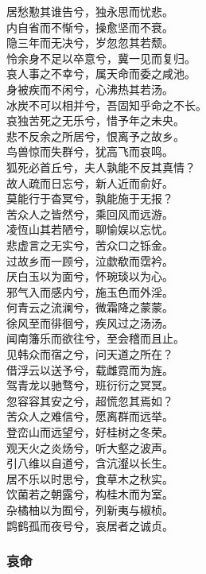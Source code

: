 \documentclass[]{article}
\begin{document}
居愁懃其谁告兮，独永思而忧悲。\\
内自省而不惭兮，操愈坚而不衰。\\
隐三年而无决兮，岁忽忽其若颓。\\
怜余身不足以卒意兮，冀一见而复归。\\
哀人事之不幸兮，属天命而委之咸池。\\
身被疾而不闲兮，心沸热其若汤。\\
冰炭不可以相并兮，吾固知乎命之不长。\\
哀独苦死之无乐兮，惜予年之未央。\\
悲不反余之所居兮，恨离予之故乡。\\
鸟兽惊而失群兮，犹高飞而哀鸣。\\
狐死必首丘兮，夫人孰能不反其真情？\\
故人疏而日忘兮，新人近而俞好。\\
莫能行于杳冥兮，孰能施于无报？\\
苦众人之皆然兮，乘回风而远游。\\
凌恆山其若陋兮，聊愉娱以忘忧。\\
悲虚言之无实兮，苦众口之铄金。\\
过故乡而一顾兮，泣歔欷而霑衿。\\
厌白玉以为面兮，怀琬琰以为心。\\
邪气入而感内兮，施玉色而外淫。\\
何青云之流澜兮，微霜降之蒙蒙。\\
徐风至而徘徊兮，疾风过之汤汤。\\
闻南籓乐而欲往兮，至会稽而且止。\\
见韩众而宿之兮，问天道之所在？\\
借浮云以送予兮，载雌霓而为旌。\\
驾青龙以驰骛兮，班衍衍之冥冥。\\
忽容容其安之兮，超慌忽其焉如？\\
苦众人之难信兮，愿离群而远举。\\
登峦山而远望兮，好桂树之冬荣。\\
观天火之炎炀兮，听大壑之波声。\\
引八维以自道兮，含沆瀣以长生。\\
居不乐以时思兮，食草木之秋实。\\
饮菌若之朝露兮，构桂木而为室。\\
杂橘柚以为囿兮，列新夷与椒桢。\\
鹍鹤孤而夜号兮，哀居者之诚贞。

\hypertarget{header-n250}{%
\subsubsection{哀命}\label{header-n250}}
\end{document}
